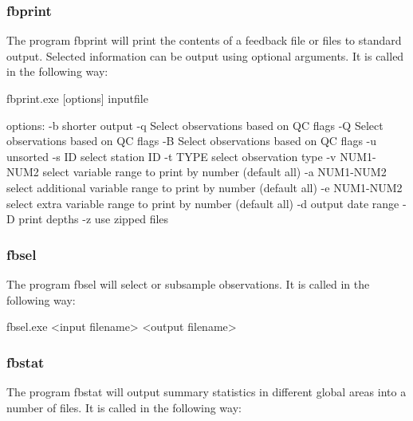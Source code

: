 \documentclass[../main/NEMO_manual]{subfiles}
\begin{document}
\subsubsection{fbprint}

The program fbprint will print the contents of a feedback file or files to standard output.
Selected information can be output using optional arguments.
It is called in the following way:

\begin{cmds}
fbprint.exe [options] inputfile

options:
     -b            shorter output
     -q            Select observations based on QC flags
     -Q            Select observations based on QC flags
     -B            Select observations based on QC flags
     -u            unsorted
     -s ID         select station ID
     -t TYPE       select observation type
     -v NUM1-NUM2  select variable range to print by number
                      (default all)
     -a NUM1-NUM2  select additional variable range to print by number
                      (default all)
     -e NUM1-NUM2  select extra variable range to print by number
                      (default all)
     -d            output date range
     -D            print depths
     -z            use zipped files
\end{cmds}

\subsubsection{fbsel}

The program fbsel will select or subsample observations.
It is called in the following way:

\begin{cmds}
fbsel.exe <input filename> <output filename>
\end{cmds}

\subsubsection{fbstat}

The program fbstat will output summary statistics in different global areas into a number of files.
It is called in the following way:
\end{document}
